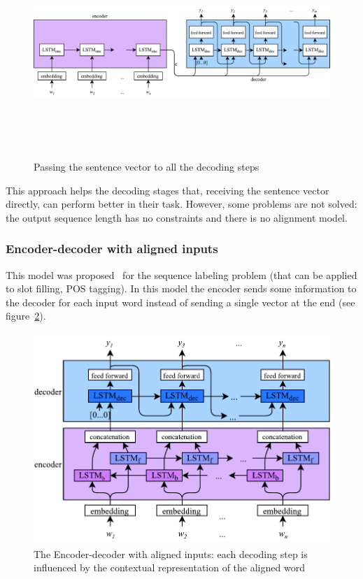 \begin{figure}[!htbp]
    \centering
    \includegraphics[max width=\linewidth,max height=8cm,keepaspectratio]{figures/encoderDecoderKeepC}
    \caption{Passing the sentence vector to all the decoding steps}\label{fig:encoderDecoderKeepC}
\end{figure}

This approach helps the decoding stages that, receiving the sentence vector directly, can perform better in their task. However, some problems are not solved: the output sequence length has no constraints and there is no alignment model.

\subsubsection{Encoder-decoder with aligned inputs}
This model was proposed~\cite{liu2016attention} for the sequence labeling problem (that can be applied to slot filling, POS tagging). In this model the encoder sends some information to the decoder for each input word instead of sending a single vector at the end (see figure~\ref{fig:encoderDecoderAligned}).

\begin{figure}[!htbp]
    \centering
    \includegraphics[max width=\linewidth,max height=8cm,keepaspectratio]{figures/encoderDecoderAligned}
    \caption{The Encoder-decoder with aligned inputs: each decoding step is influenced by the contextual representation of the aligned word}\label{fig:encoderDecoderAligned}
\end{figure}

